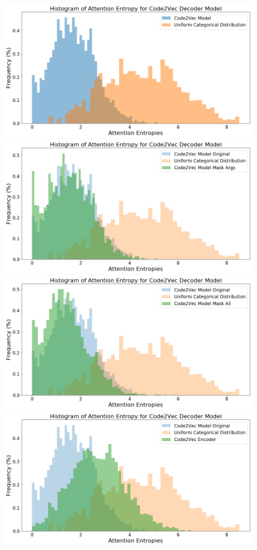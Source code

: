 \begin{figure}
\begin{center}
\includegraphics[width=.8\linewidth]{ImagesCodeRelated/code2vec_entropies.png}
\includegraphics[width=0.8\linewidth]{ImagesCodeRelated/entropies_mask_args.png} 
\includegraphics[width=0.8\linewidth]{ImagesCodeRelated/entropies_mask_all.png}
\includegraphics[width=.8\linewidth]{ImagesCodeRelated/save_c2e_encoder.png}
\end{center}
\end{figure}

